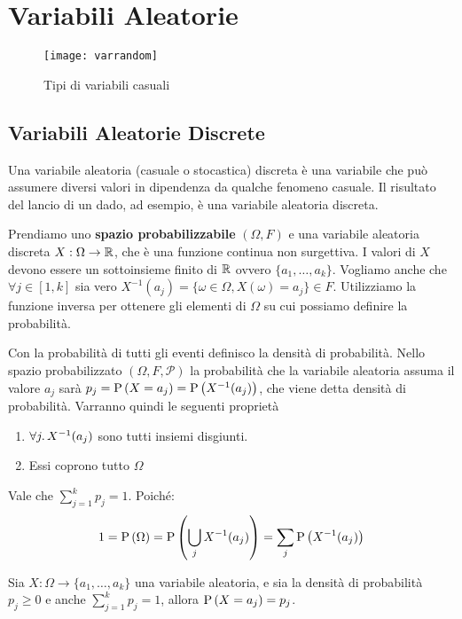 \chapter{Variabili Aleatorie}

\begin{figure}[H]
	\centering
	\caption{Tipi di variabili casuali}
	\texttt{[image: varrandom]}
\end{figure}

\section{Variabili Aleatorie Discrete}

Una variabile aleatoria (casuale o stocastica) discreta è una variabile che può assumere diversi valori in dipendenza da qualche fenomeno casuale.
Il risultato del lancio di un dado, ad esempio, è una variabile aleatoria discreta.

Prendiamo uno \textbf{spazio probabilizzabile} $ (\Omega, F) $ e una variabile aleatoria discreta $ X : \Omega \to \mathbb{R} $, che è una funzione continua non surgettiva. I valori di $ X $ devono essere un sottoinsieme finito di $ \mathbb{R} $ ovvero $ \{a_1, \dots, a_k\} $.
Vogliamo anche che $ \forall j \in [1, k] $ sia vero $ X^{-1}(a_j) = \{ \omega \in \Omega, X(\omega) = a_j\} \in F $. Utilizziamo la funzione inversa per ottenere gli elementi di $ \Omega $ su cui possiamo definire la probabilità.

Con la probabilità di tutti gli eventi definisco la densità di probabilità. Nello spazio probabilizzato $ (\Omega, F, \mathcal{P}) $ la probabilità che la variabile aleatoria assuma il valore $ a_j $ sarà $ p_j = \text{P}\left(X = a_j\right) = \text{P}\left(X^{-1}(a_j)\right) $, che viene detta densità di probabilità. Varranno quindi le seguenti proprietà

\begin{enumerate}
	\item $ \forall j \ldotp X^{-1} (a_j) $ sono tutti insiemi disgiunti.
	\item Essi coprono tutto $ \Omega $
\end{enumerate}

Vale che $ \sum_{j=1}^{k} p_j = 1 $. Poiché:
\[ 1 = \text{P}\left(\Omega\right) = \text{P}\left(\bigcup_{j} X^{-1}(a_j)\right) = \sum_{j} \text{P}\left(X^{-1}(a_j)\right)\] 

Sia $ X : \Omega \to \{ a_1, \dots, a_k \} $ una variabile aleatoria, e sia la densità di probabilità $ p_j \geq 0 $ e anche  $ \sum_{j=1}^{k} p_j = 1 $, allora $ \text{P}\left(X = a_j\right) = p_j $.

